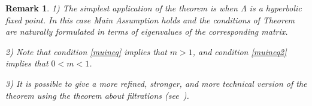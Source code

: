 \documentclass[11pt]{article}
\newcounter{razdel}[section]
\theoremstyle{Mystyle}
\newtheorem{Remark}[razdel]{Remark}
\begin{document}
\begin{Remark}

1) The simplest application of the theorem is when $\Lambda$ is a hyperbolic fixed point. In this case Main Assumption holds and the conditions of Theorem are naturally formulated in terms of eigenvalues of the corresponding matrix.%

2) Note that condition \eqref{muineq} implies that $m>1$, and condition \eqref{muineq2} implies that $0<m<1$.

3) %
It is possible to give a more refined, stronger, and more technical version of the theorem using the theorem about filtrations (see~\cite{Pes}). 

\end{Remark}
\end{document}
